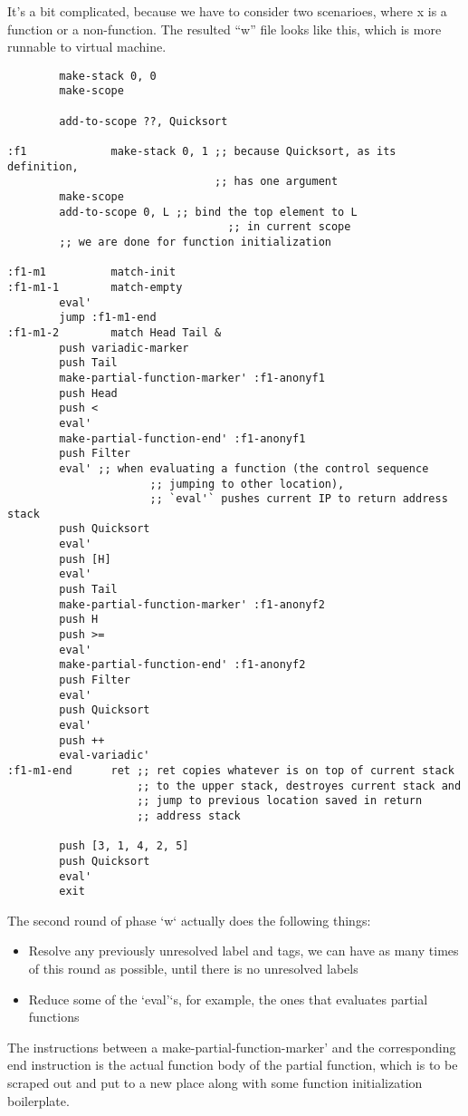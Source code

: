 \documentclass{article}
\begin{document}
It's a bit complicated, because we have to consider two scenarioes, where x is a function or a non-function. The resulted ``w'' file looks like this, which is more runnable to virtual machine.

\begin{Verbatim}
		make-stack 0, 0
		make-scope

		add-to-scope ??, Quicksort

:f1             make-stack 0, 1 ;; because Quicksort, as its definition,
                                ;; has one argument
		make-scope
		add-to-scope 0, L ;; bind the top element to L
                                  ;; in current scope
		;; we are done for function initialization

:f1-m1          match-init
:f1-m1-1        match-empty
		eval'
		jump :f1-m1-end
:f1-m1-2        match Head Tail &
		push variadic-marker
		push Tail
		make-partial-function-marker' :f1-anonyf1
		push Head
		push <
		eval'
		make-partial-function-end' :f1-anonyf1
		push Filter
		eval' ;; when evaluating a function (the control sequence
                      ;; jumping to other location),
                      ;; `eval'` pushes current IP to return address stack
		push Quicksort
		eval'
		push [H]
		eval'
		push Tail
		make-partial-function-marker' :f1-anonyf2
		push H
		push >=
		eval'
		make-partial-function-end' :f1-anonyf2
		push Filter
		eval'
		push Quicksort
		eval'
		push ++
		eval-variadic'
:f1-m1-end      ret ;; ret copies whatever is on top of current stack
                    ;; to the upper stack, destroyes current stack and
                    ;; jump to previous location saved in return
                    ;; address stack

		push [3, 1, 4, 2, 5]
		push Quicksort
		eval'
		exit
\end{Verbatim}

The second round of phase `w` actually does the following things:

\begin{itemize}
\item Resolve any previously unresolved label and tags, we can have
  as many times of this round as possible, until there is no
  unresolved labels
\item Reduce some of the `eval'`s, for example, the
  ones that evaluates partial functions
\end{itemize}

The instructions between a make-partial-function-marker' and the corresponding end instruction is the actual function body of the partial function, which is to be scraped out and put to a new place along with some function initialization boilerplate.\\
\end{document}
